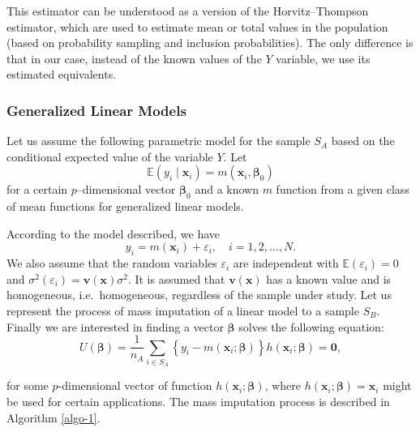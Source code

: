 \documentclass[
]{jss}
\begin{document}
This estimator can be understood as a version of the Horvitz--Thompson
estimator, which are used to estimate mean or total values in the
population (based on probability sampling and inclusion probabilities).
The only difference is that in our case, instead of the known values of
the \(Y\) variable, we use its estimated equivalents.

\hypertarget{generalized-linear-models}{%
\subsubsection{Generalized Linear
Models}\label{generalized-linear-models}}

Let us assume the following parametric model for the sample \(S_A\)
based on the conditional expected value of the variable \(Y\). Let
\begin{equation}
\mathbb{E}\left(y_i \mid \boldsymbol{x}_i\right)=m\left(\boldsymbol{x}_i, \boldsymbol{\beta}_0\right)
\end{equation} for a certain \(p\)--dimensional vector
\(\boldsymbol{\beta}_0\) and a known \(m\) function from a given class
of mean functions for generalized linear models.

According to the model described, we have \[
y_i=m\left(\boldsymbol{x}_i\right)+\varepsilon_i, \quad i=1,2, \ldots, N.
\] We also assume that the random variables \(\varepsilon_i\) are
independent with \(\mathbb{E} \left(\varepsilon_i \right) = 0\) and
\(\sigma^2 \left(\varepsilon_i \right) = \mathbf{v} \left(\boldsymbol{x}\right) \sigma^2\).
It is assumed that \(\mathbf{v} \left(\boldsymbol{x}\right)\) has a
known value and is homogeneous, i.e.~homogeneous, regardless of the
sample under study. Let us represent the process of mass imputation of a
linear model to a sample \(S_B\). Finally we are interested in finding a
vector \(\boldsymbol{\beta}\) solves the following equation:
\begin{equation}
\label{eq-2.3}
U(\boldsymbol{\beta})=\frac{1}{n_A} \sum_{i \in S_A}\left\{y_i-m\left(\boldsymbol{x}_i ; \boldsymbol{\beta}\right)\right\} h\left(\boldsymbol{x}_i ; \boldsymbol{\beta}\right)=\mathbf{0},
\end{equation}

for some \(p\)-dimensional vector of function
\(h\left(\boldsymbol{x}_i ; \boldsymbol{\beta}\right)\), where
\(h\left(\boldsymbol{x}_i ; \boldsymbol{\beta}\right) = \boldsymbol{x}_i\)
might be used for certain applications. The mass imputation process is
described in Algorithm \ref{algo-1}.
\end{document}
